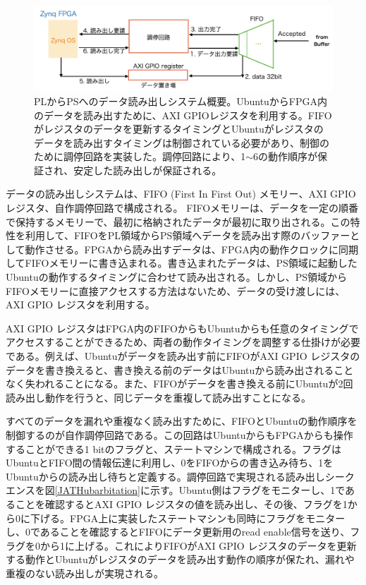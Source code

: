 \begin{figure} 
\centering
\includegraphics[width=16cm]{fig/QAQC/JATHubarbitator.png}
\caption[PLからPSへのデータ読み出しシステム概要]{PLからPSへのデータ読み出しシステム概要。UbuntuからFPGA内のデータを読み出すために、AXI GPIOレジスタを利用する。FIFOがレジスタのデータを更新するタイミングとUbuntuがレジスタのデータを読み出すタイミングは制御されている必要があり、制御のために調停回路を実装した。調停回路により、1$\sim$6の動作順序が保証され、安定した読み出しが保証される。}
\label{JATHubarbitor}
\end{figure}

データの読み出しシステムは、FIFO (First In First Out) メモリー、AXI GPIO レジスタ、自作調停回路で構成される。
FIFOメモリーは、データを一定の順番で保持するメモリーで、最初に格納されたデータが最初に取り出される。この特性を利用して、FIFOをPL領域からPS領域へデータを読み出す際のバッファーとして動作させる。FPGAから読み出すデータは、FPGA内の動作クロックに同期してFIFOメモリーに書き込まれる。書き込まれたデータは、PS領域に起動したUbuntuの動作するタイミングに合わせて読み出される。しかし、PS領域からFIFOメモリーに直接アクセスする方法はないため、データの受け渡しには、AXI GPIO レジスタを利用する。

AXI GPIO レジスタはFPGA内のFIFOからもUbuntuからも任意のタイミングでアクセスすることができるため、両者の動作タイミングを調整する仕掛けが必要である。例えば、Ubuntuがデータを読み出す前にFIFOがAXI GPIO レジスタのデータを書き換えると、書き換える前のデータはUbuntuから読み出されることなく失われることになる。また、FIFOがデータを書き換える前にUbuntuが2回読み出し動作を行うと、同じデータを重複して読み出すことになる。

すべてのデータを漏れや重複なく読み出すために、FIFOとUbuntuの動作順序を制御するのが自作調停回路である。この回路はUbuntuからもFPGAからも操作することができる1 bitのフラグと、ステートマシンで構成される。フラグはUbuntuとFIFO間の情報伝達に利用し、0をFIFOからの書き込み待ち、1をUbuntuからの読み出し待ちと定義する。調停回路で実現される読み出しシークエンスを図\ref{JATHubarbitation}に示す。Ubuntu側はフラグをモニターし、1であることを確認するとAXI GPIO レジスタの値を読み出し、その後、フラグを1から0に下げる。FPGA上に実装したステートマシンも同時にフラグをモニターし、0であることを確認するとFIFOにデータ更新用のread enable信号を送り、フラグを0から1に上げる。これによりFIFOがAXI GPIO レジスタのデータを更新する動作とUbuntuがレジスタのデータを読み出す動作の順序が保たれ、漏れや重複のない読み出しが実現される。

